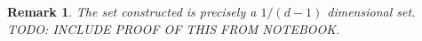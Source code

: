 \documentclass{report}
\theoremstyle{plain}
\theoremstyle{plain}
\newtheorem*{remark}{Remark}
\begin{document}
\begin{remark}
    The set constructed is precisely a $1/(d-1)$ dimensional set. TODO: INCLUDE PROOF OF THIS FROM NOTEBOOK.
\end{remark}



%

%
%

%
%
%
%
\end{document}
